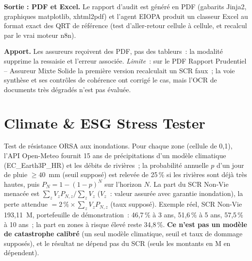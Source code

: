 \documentclass[11pt,a4paper]{article}
\begin{document}
\textbf{Sortie : PDF et Excel.} Le rapport d'audit est g\'en\'er\'e en PDF (gabarits Jinja2, graphiques matplotlib, xhtml2pdf) et l'agent EIOPA produit un classeur Excel au format exact des QRT de r\'ef\'erence (test d'aller-retour cellule \`a cellule, et recalcul par le vrai moteur n8n).

\textbf{Apport.} Les assureurs re\c{c}oivent des PDF, pas des tableurs~: la modalit\'e supprime la ressaisie et l'erreur associ\'ee. \emph{Limite}~: sur le PDF \og Rapport Prudentiel -- Assureur Mixte Solide\fg{} la premi\`ere version recalculait un SCR faux~; la voie \og synth\`ese\fg{} et ses contr\^oles de coh\'erence ont corrig\'e le cas, mais l'OCR de documents tr\`es d\'egrad\'es n'est pas \'evalu\'ee.

\section{Climate \& ESG Stress Tester}
Test de r\'esistance ORSA aux inondations. Pour chaque zone (cellule de 0,1\textdegree), l'API Open-Meteo fournit 15 ans de pr\'ecipitations d'un mod\`ele climatique (EC\_Earth3P\_HR) et les d\'ebits de rivi\`eres~; la probabilit\'e annuelle $p$ d'un jour de pluie $\geq 40$~mm (seuil suppos\'e) est relev\'ee de 25\,\% si les rivi\`eres sont d\'ej\`a tr\`es hautes, puis $P_N = 1-(1-p)^N$ sur l'horizon $N$. La part du SCR Non-Vie menac\'ee est $\sum_z V_z P_{N,z} / \sum_z V_z$ ($V_z$~: valeur assur\'ee avec garantie inondation), la perte attendue $= 2\,\% \times \sum_z V_z P_{N,z}$ (taux suppos\'e). Exemple r\'eel, SCR Non-Vie 193,11~M\texteuro, portefeuille de d\'emonstration~: 46,7\,\% \`a 3 ans, 51,6\,\% \`a 5 ans, 57,5\,\% \`a 10 ans~; la part en zones \`a risque \'elev\'e reste 34,8\,\%. \textbf{Ce n'est pas un mod\`ele de catastrophe calibr\'e} (un seul mod\`ele climatique, seuil et taux de dommage suppos\'es), et le r\'esultat ne d\'epend pas du SCR (seuls les montants en M\texteuro{} en d\'ependent).
\end{document}
